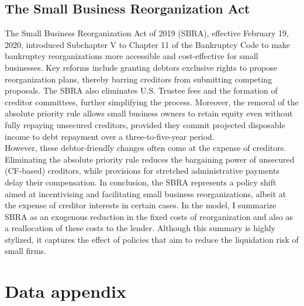 \documentclass[12pt]{article}
\begin{document}
\subsection{The Small Business Reorganization Act \label{sec:A2}}

The Small Business Reorganization Act of 2019 (SBRA), effective February 19, 2020, introduced Subchapter V to Chapter 11 of the Bankruptcy Code to make bankruptcy reorganizations more accessible and cost-effective for small businesses. Key reforms include granting debtors exclusive rights to propose reorganization plans, thereby barring creditors from submitting competing proposals. The SBRA also eliminates U.S. Trustee fees and the formation of creditor committees, further simplifying the process. Moreover, the removal of the absolute priority rule allows small business owners to retain equity even without fully repaying unsecured creditors, provided they commit projected disposable income to debt repayment over a three-to-five-year period. \vspace{3mm} \\
However, these debtor-friendly changes often come at the expense of creditors.  Eliminating the absolute priority rule reduces the bargaining power of unsecured (CF-based) creditors, while provisions for stretched administrative payments delay their compensation. In conclusion, the SBRA represents a policy shift aimed at incentivising and facilitating small business reorganizations, albeit at the expense of creditor interests in certain cases. In the model, I summarize SBRA as an exogenous reduction in the fixed costs of reorganization and also as a reallocation of these costs to the lender. Although this summary is highly stylized, it captures the effect of policies that aim to reduce the liquidation risk of small firms. 

\section{Data appendix \label{sec:A3}}
\end{document}
